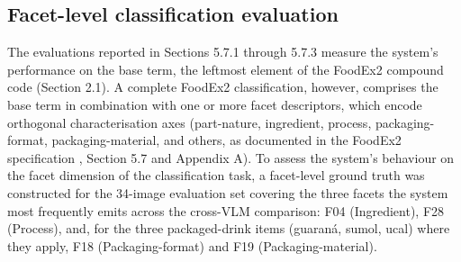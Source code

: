 \hypertarget{facet-level-classification-evaluation}{%
\subsection{Facet-level classification evaluation}\label{facet-level-classification-evaluation}}

The evaluations reported in Sections 5.7.1 through 5.7.3 measure the system's performance on the base term, the leftmost element of the FoodEx2 compound code (Section 2.1). A complete FoodEx2 classification, however, comprises the base term in combination with one or more facet descriptors, which encode orthogonal characterisation axes (part-nature, ingredient, process, packaging-format, packaging-material, and others, as documented in the FoodEx2 specification \parencite{european_food_safety_authority__efsa__200edd3d}, Section 5.7 and Appendix A). To assess the system's behaviour on the facet dimension of the classification task, a facet-level ground truth was constructed for the 34-image evaluation set covering the three facets the system most frequently emits across the cross-VLM comparison: F04 (Ingredient), F28 (Process), and, for the three packaged-drink items (guaraná, sumol, ucal) where they apply, F18 (Packaging-format) and F19 (Packaging-material).


